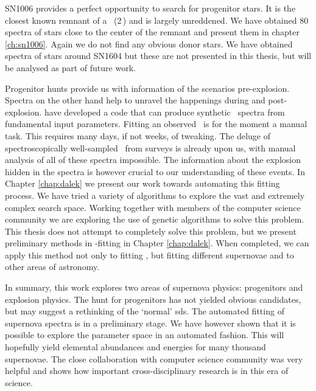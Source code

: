 SN1006 provides a perfect opportunity to search for progenitor stars. It is the closest known remnant of a \snia\ (2\,\kpc) and is largely unreddened. We have obtained 80 spectra of stars close to the center of the remnant and present them in chapter \ref{ch:sn1006}. Again we do not find any obvious donor stars. We have obtained spectra of stars around SN1604 but these are not presented in this thesis, but will be analysed as part of future work.

Progenitor hunts provide us with information of the scenarios pre-explosion. Spectra on the other hand help to unravel the happenings during and post-explosion. \cite{2008MNRAS.386.1897M} have developed a code that can produce synthetic \snia\ spectra from fundamental input parameters. Fitting an observed \snia\ is for the moment a manual task. This requires many days, if not weeks, of tweaking. The deluge of spectroscopically well-sampled \sneia\ from surveys is already upon us, with manual analysis of all of these spectra impossible. The information about the explosion hidden in the spectra is however crucial to our understanding of these events. In Chapter \ref{chap:dalek} we present our work towards automating this fitting process. We have tried a variety of algorithms to explore the vast and extremely complex search space. Working together with members of the computer science community we are exploring the use of genetic algorithms to solve this problem. This thesis does not attempt to completely solve this problem, but we present preliminary methods in \snia-fitting in Chapter \ref{chap:dalek}. When completed, we can apply this method not only to fitting \snia, but fitting different supernovae and to other areas of astronomy. 

In summary, this work explores two areas of supernova physics: progenitors and explosion physics. The hunt for progenitors has not yielded obvious candidates, but may suggest a rethinking of the `normal' \gls{sds}. The automated fitting of supernova spectra is in a preliminary stage. We have however shown that it is possible to explore the parameter space in an automated fashion. This will hopefully yield elemental abundances and energies for many thousand supernovae. The close collaboration with computer science community was very helpful and shows how important cross-disciplinary research is in this era of science. 



